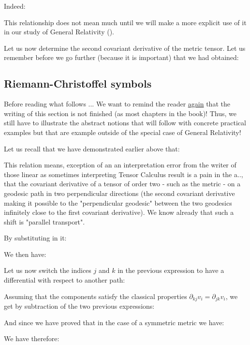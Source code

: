 	Indeed:
	
	This relationship does not mean much until we will make a more explicit use of it in our study of General Relativity ().

	Let us now determine the second covariant derivative of the metric tensor. Let us remember before we go further (because it is important) that we had obtained:
	
	
	\subsection{Riemann-Christoffel symbols}\begin{tcolorbox}[colback=red!5,borderline={1mm}{2mm}{red!5},arc=0mm,boxrule=0pt]
	\bcbombe Before reading what follows ... We want to remind the reader \underline{again} that the writing of this section is not finished (as most chapters in the book)! Thus, we still have to illustrate the abstract notions that will follow with concrete practical examples but that are example outside of the special case of General Relativity!
	\end{tcolorbox}
	
	Let us recall that we have demonstrated earlier above that:
	
	This relation means, exception of an an interpretation error from the writer of those linear as sometimes interpreting Tensor Calculus result is a pain in the a.., that the covariant derivative of a tensor of order two - such as the metric - on a geodesic path in two perpendicular directions (the second covariant derivative making it possible to the "perpendicular geodesic" between the two geodesics infinitely close to the first covariant derivative). We know already that such a shift is "parallel transport".
	
	By substituting in it:
	
	We then have:
	
	Let us now switch the indices $j$ and $k$ in the previous expression to have a differential with respect to another path:
	
	Assuming that the components satisfy the classical properties $\partial_{kj}v_i=\partial_{jk}v_i$, we get by subtraction of the two previous expressions:
	
	And since we have proved that in the case of a symmetric metric we have:
	
	We have therefore:
	
